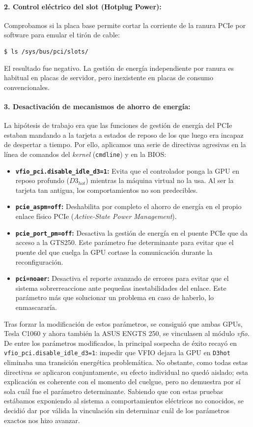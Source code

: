 \paragraph{2. Control eléctrico del slot (Hotplug Power):}
Comprobamos si la placa base permite cortar la corriente de la ranura PCIe por software para 
emular el tirón de cable:
\begin{lstlisting}[language=bash]
$ ls /sys/bus/pci/slots/
\end{lstlisting}
El resultado fue negativo. La gestión de energía independiente por ranura es habitual en placas 
de servidor, pero inexistente en placas de consumo convencionales.

\paragraph{3. Desactivación de mecanismos de ahorro de energía:}
La hipótesis de trabajo era que las funciones de gestión de energía del PCIe estaban 
mandando a la tarjeta a estados de reposo de los que luego era incapaz de despertar a tiempo. 
Por ello, aplicamos una serie de directivas agresivas en la línea de comandos del \textit{kernel} 
(\texttt{cmdline}) y en la BIOS:
\begin{itemize}
    \item \textbf{\texttt{vfio\_pci.disable\_idle\_d3=1}:} Evita que el controlador ponga la GPU en 
    reposo profundo ($D3_{hot}$) mientras la máquina virtual no la usa. Al ser la tarjeta tan antigua, 
    los comportamientos no son predecibles.
    \item \textbf{\texttt{pcie\_aspm=off}:} Deshabilita por completo el ahorro de energía en el propio 
    enlace físico PCIe (\textit{Active-State Power Management}).
    \item \textbf{\texttt{pcie\_port\_pm=off}:} Desactiva la gestión de energía en el puente 
    PCIe que da acceso a la GTS250. Este parámetro fue determinante para evitar que el puente del que cuelga la GPU
    cortase la comunicación durante la reconfiguración.
    \item \textbf{\texttt{pci=noaer}:} Desactiva el reporte avanzado de errores para evitar que el 
    sistema sobrerreaccione ante pequeñas inestabilidades del enlace. Este parámetro más que solucionar un problema
    en caso de haberlo, lo enmascararía.
\end{itemize}

Tras forzar la modificación de estos parámetros, se consiguió que ambas GPUs, Tesla C1060 y ahora también la ASUS ENGTS 250,
se vinculasen al módulo \textit{vfio}.
De entre los parámetros modificados, la principal sospecha de éxito recayó en \texttt{vfio\_pci.disable\_idle\_d3=1}: 
impedir que VFIO dejara la GPU en \texttt{D3hot} eliminaba una transición energética problemática. 
No obstante, como todas estas directivas se aplicaron conjuntamente, su efecto 
individual no quedó aislado; esta explicación es coherente con el momento del cuelgue, pero no demuestra por sí 
sola cuál fue el parámetro determinante. Sabiendo que con estas pruebas estábamos exponiendo al sistema a comportamientos
eléctricos no conocidos, se decidió dar por válida la vinculación sin determinar cuál de los parámetros exactos 
nos hizo avanzar.


